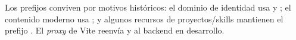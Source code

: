 \begin{NotaTecnica}
Los prefijos conviven por motivos históricos: el dominio de identidad usa  y
; el contenido moderno usa ; y algunos recursos de
proyectos/skills mantienen el prefijo . El \textit{proxy} de Vite reenvía
 y  al backend en desarrollo.
\end{NotaTecnica}

\clearpage
